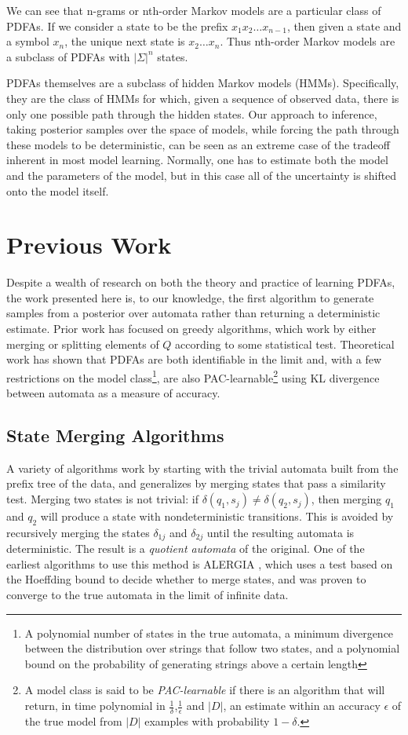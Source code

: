 \documentclass[11pt]{article}
\begin{document}
We can see that n-grams or nth-order Markov models are a particular class of PDFAs.  If we consider a state to be the prefix $x_1 x_2 \ldots x_{n-1}$, then given a state and a symbol $x_n$, the unique next state is $x_2 \ldots x_n$.  Thus nth-order Markov models are a subclass of PDFAs with $|\Sigma|^n$ states.

PDFAs themselves are a subclass of hidden Markov models (HMMs).  Specifically, they are the class of HMMs for which, given a sequence of observed data, there is only one possible path through the hidden states.  Our approach to inference, taking posterior samples over the space of models, while forcing the path through these models to be deterministic, can be seen as an extreme case of the tradeoff inherent in most model learning.  Normally, one has to estimate both the model and the parameters of the model, but in this case all of the uncertainty is shifted onto the model itself.

\section{Previous Work}

Despite a wealth of research on both the theory and practice of learning PDFAs, the work presented here is, to our knowledge, the first algorithm to generate samples from a posterior over automata rather than returning a deterministic estimate.  Prior work has focused on greedy algorithms, which work by either merging or splitting elements of $Q$ according to some statistical test.  Theoretical work has shown that PDFAs are both identifiable in the limit and, with a few restrictions on the model class\footnote{A polynomial number of states in the true automata, a minimum divergence between the distribution over strings that follow two states, and a polynomial bound on the probability of generating strings above a certain length}, are also PAC-learnable\footnote{A model class is said to be {\em PAC-learnable} if there is an algorithm that will return, in time polynomial in $\frac{1}{\delta}$,$\frac{1}{\epsilon}$ and $|D|$, an estimate within an accuracy $\epsilon$ of the true model from $|D|$ examples with probability $1-\delta$.} using KL divergence between automata as a measure of accuracy.

\subsection{State Merging Algorithms}
A variety of algorithms work by starting with the trivial automata built from the prefix tree of the data, and generalizes by merging states that pass a similarity test.  Merging two states is not trivial: if $\delta(q_1,s_j) \ne \delta(q_2,s_j)$, then merging $q_1$ and $q_2$ will produce a state with nondeterministic transitions.  This is avoided by recursively merging the states $\delta_{1j}$ and $\delta_{2j}$ until the resulting automata is deterministic.  The result is a {\em quotient automata} of the original.  One of the earliest algorithms to use this method is ALERGIA \cite{Oncina1994}, which uses a test based on the Hoeffding bound to decide whether to merge states, and was proven to converge to the true automata in the limit of infinite data.
\end{document}
